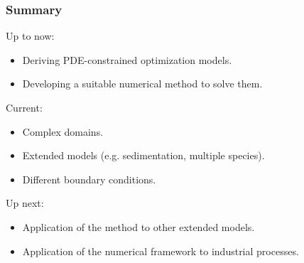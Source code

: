 \documentclass[aspectratio=169,xcolor=dvipsnames]{beamer}
\begin{document}
\begin{frame}
	\frametitle{Summary}
	Up to now:
	\begin{itemize}
		\item Deriving PDE-constrained optimization models.
		\item Developing a suitable numerical method to solve them.
	\end{itemize}
	Current:
	\begin{itemize}
		\item Complex domains.
		\item Extended models (e.g. sedimentation, multiple species).
		\item Different boundary conditions.
	\end{itemize}
	Up next:
	\begin{itemize}
		\item Application of the method to other extended models.
		\item Application of the numerical framework to industrial processes.
	\end{itemize}
	
\end{frame}

\appendix
\end{document}
